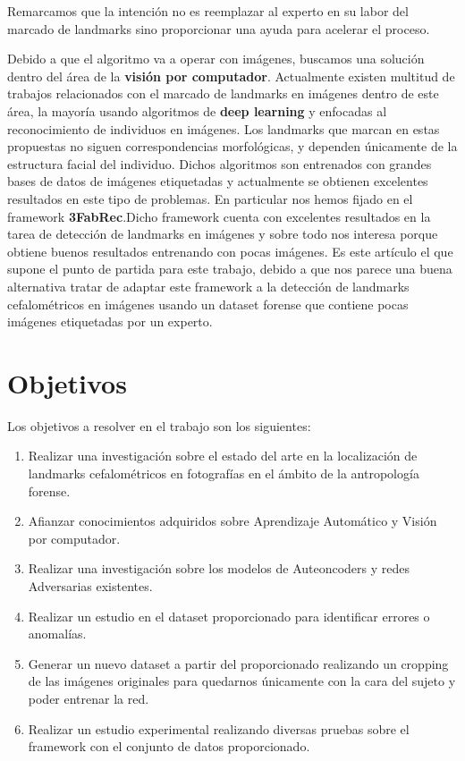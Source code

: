 \noindent Remarcamos que la intención no es reemplazar al experto en su labor del marcado de landmarks sino proporcionar una ayuda para acelerar el proceso.

\medskip 

\noindent Debido a que el algoritmo va a operar con imágenes, buscamos una solución dentro del área de la \textbf{visión por computador}. Actualmente existen  multitud de trabajos relacionados con el marcado de landmarks en imágenes dentro de este área, la mayoría usando algoritmos de \textbf{deep learning} y enfocadas al reconocimiento de individuos en imágenes. Los landmarks que marcan en estas propuestas no siguen correspondencias morfológicas, y dependen únicamente de la estructura facial del individuo. Dichos algoritmos son entrenados con grandes bases de datos de imágenes etiquetadas y actualmente se obtienen excelentes resultados en este tipo de problemas. En particular nos hemos fijado en el framework \textbf{3FabRec}\cite{browatzki20203fabrec}.Dicho framework cuenta con excelentes resultados en la tarea de detección de landmarks en imágenes y sobre todo nos interesa porque obtiene buenos resultados entrenando con pocas imágenes. Es este artículo el que supone el punto de partida para este trabajo, debido a que nos parece una buena alternativa tratar de adaptar este framework a la detección de landmarks cefalométricos en imágenes usando un dataset forense que contiene pocas imágenes etiquetadas por un experto.

\section{Objetivos}

\noindent Los objetivos a resolver en el trabajo son los siguientes: 

\begin{enumerate}
    \item Realizar una investigación sobre el estado del arte en la localización de landmarks cefalométricos en fotografías en el ámbito de la antropología forense.
    \item Afianzar conocimientos adquiridos sobre Aprendizaje Automático y Visión por computador.
    \item Realizar una investigación sobre los modelos de Auteoncoders y redes Adversarias existentes.
    \item Realizar un estudio en el dataset proporcionado para identificar errores o anomalías.
    \item Generar un nuevo dataset a partir del proporcionado realizando un cropping de las imágenes originales para quedarnos únicamente con la cara del sujeto y poder entrenar la red.
    \item Realizar un estudio experimental realizando diversas pruebas sobre el framework con el conjunto de datos proporcionado.
\end{enumerate}


